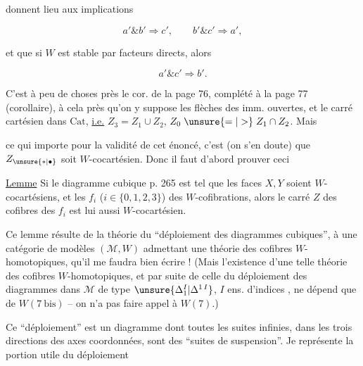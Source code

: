 donnent lieu aux implications

\[
a'\mathbin{\&}b'\Longrightarrow c',\qquad b'\mathbin{\&}c'\Longrightarrow a',
\]

et que si $W$ est stable par facteurs directs, alors

\[
a'\mathbin{\&}c'\Longrightarrow b'.
\]

C'est à peu de choses près le cor. de la page 76, complété à la page 77 (corollaire), à cela près qu'on y suppose les flèches des imm. ouvertes, et le carré cartésien  dans $\mathrm{Cat}$, \uline{i.e.} $Z_3=Z_1\cup Z_2$, $Z_0\mathrel{\unsure{=|>}}Z_1\cap Z_2$. Mais

ce qui importe pour la validité de cet énoncé, c'est (on s'en doute) que $Z_{\unsure{*|\bullet}}$ soit $W$-cocartésien. Donc il faut d'abord prouver ceci

\uline{Lemme} Si le diagramme cubique p. 265 est tel que les faces $X,Y$ soient $W$-cocartésiens, et  les $f_i$ ($i\in\{0,1,2,3\}$) des $W$-cofibrations, alors le carré $Z$  des cofibres des $f_i$ est lui aussi $W$-cocartésien.

Ce lemme résulte de la théorie du ``déploiement des diagrammes cubiques'',   à une catégorie de modèles $(\mathcal M,W)$ admettant une théorie des cofibres $W$-homotopiques, qu'il me faudra bien écrire ! (Mais l'existence  d'une telle théorie des cofibres $W$-homotopiques, et par suite de celle du déploiement des diagrammes dans $\mathcal M$ de type $\unsure{\Delta_1^{I}|\Delta^{1\,I}}$, $I$ ens. d'indices , ne dépend que de $W(7\ \mathrm{bis})$ -- on n'a pas  faire appel à $W(7)$.)

Ce ``déploiement'' est un diagramme  dont toutes les suites infinies, dans les trois directions des axes  coordonnées, sont des ``suites de suspension''. Je représente la portion utile du déploiement

